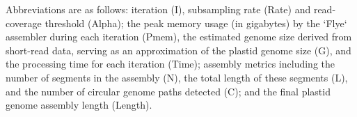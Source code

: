 \begingroup
\scriptsize
\setlength{\parskip}{2pt}

Abbreviations are as follows: 
iteration (I), subsampling rate (Rate) and read-coverage threshold (Alpha);
the peak memory usage (in gigabytes) by the `Flye` assembler during each iteration (Pmem),
the estimated genome size derived from short-read data, serving as an approximation of the plastid genome size (G), and
the processing time for each iteration (Time);
assembly metrics including the number of segments in the assembly (N),
the total length of these segments (L), and
the number of circular genome paths detected (C); and
the final plastid genome assembly length (Length).

\endgroup

